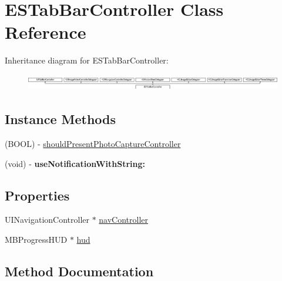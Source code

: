 \hypertarget{interface_e_s_tab_bar_controller}{}\section{E\+S\+Tab\+Bar\+Controller Class Reference}
\label{interface_e_s_tab_bar_controller}
Inheritance diagram for E\+S\+Tab\+Bar\+Controller\+:\begin{figure}[H]
\begin{center}
\leavevmode
\includegraphics[height=0.723982cm]{interface_e_s_tab_bar_controller}
\end{center}
\end{figure}
\subsection*{Instance Methods}
\begin{DoxyCompactItemize}
\item 
(B\+O\+O\+L) -\/ \hyperlink{interface_e_s_tab_bar_controller_a9faca8ecf0e7ec5ae14d31a13484c447}{should\+Present\+Photo\+Capture\+Controller}
\item 
\hypertarget{interface_e_s_tab_bar_controller_ad8ed71268a554c2ab3d2de9624f9a02a}{}(void) -\/ {\bfseries use\+Notification\+With\+String\+:}\label{interface_e_s_tab_bar_controller_ad8ed71268a554c2ab3d2de9624f9a02a}

\end{DoxyCompactItemize}
\subsection*{Properties}
\begin{DoxyCompactItemize}
\item 
U\+I\+Navigation\+Controller $\ast$ \hyperlink{interface_e_s_tab_bar_controller_a9e774edfbc8903ac7dd0db2c069e825f}{nav\+Controller}
\item 
M\+B\+Progress\+H\+U\+D $\ast$ \hyperlink{interface_e_s_tab_bar_controller_aaa6ebc324e13f104923fbd91ef657f31}{hud}
\end{DoxyCompactItemize}


\subsection{Method Documentation}
\hypertarget{interface_e_s_tab_bar_controller_a9faca8ecf0e7ec5ae14d31a13484c447}{}
